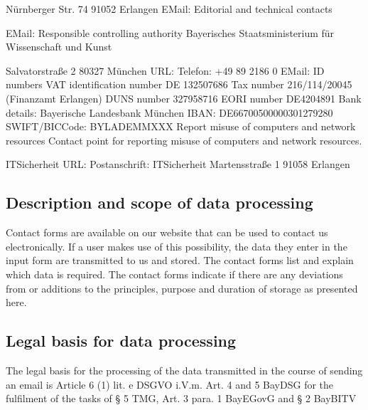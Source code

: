 \documentclass[letterpaper,10pt,english]{sphinxmanual}
\begin{document}
\sphinxAtStartPar
Nürnberger Str. 74
91052 Erlangen
EMail: 
Editorial and technical contacts

\sphinxAtStartPar
EMail: 
Responsible controlling authority
Bayerisches Staatsministerium für Wissenschaft und Kunst

\sphinxAtStartPar
Salvatorstraße 2
80327 München
URL: 
Telefon: +49 89 2186 0
E\sphinxhyphen{}Mail: 
ID numbers
VAT identification number       DE 132507686
Tax number      216/114/20045 (Finanzamt Erlangen)
DUNS number     327958716
EORI number     DE4204891
Bank details:   Bayerische Landesbank München
IBAN: DE66700500000301279280
SWIFT/BIC\sphinxhyphen{}Code: BYLADEMMXXX
Report misuse of computers and network resources
Contact point for reporting misuse of computers and network resources.

\sphinxAtStartPar
IT\sphinxhyphen{}Sicherheit
URL: 
Postanschrift:
IT\sphinxhyphen{}Sicherheit
Martensstraße 1
91058 Erlangen


\subsection{Description and scope of data processing}
\label{\detokenize{policies/legal:description-and-scope-of-data-processing}}
\sphinxAtStartPar
Contact forms are available on our website that can be used to contact us electronically. If a user makes use of this possibility, the data they enter in the input form are transmitted to us and stored. The contact forms list and explain which data is required. The contact forms indicate if there are any deviations from or additions to the principles, purpose and duration of storage as presented here.


\subsection{Legal basis for data processing}
\label{\detokenize{policies/legal:legal-basis-for-data-processing}}
\sphinxAtStartPar
The legal basis for the processing of the data transmitted in the course of sending an email is Article 6 (1) lit. e DSGVO i.V.m. Art. 4 and 5 BayDSG for the fulfilment of the tasks of \S{} 5 TMG, Art. 3 para. 1 BayEGovG and \S{} 2 BayBITV
\end{document}
